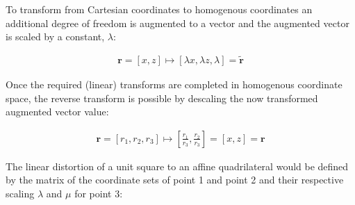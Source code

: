 %
To transform from Cartesian coordinates to homogenous coordinates an additional degree of freedom is augmented to a vector and the augmented vector is scaled by a constant, $\lambda$:

\begin{align}
\textbf{r} = [x,z] \mapsto  [\lambda x, \lambda z, \lambda] = \widetilde{\textbf{r}} \label{eq:cart2homo}
\end{align}

Once the required (linear) transforms are completed in homogenous coordinate space, the reverse transform is possible by descaling the now transformed augmented vector value:

\begin{align}
{\textbf{r}} =[r_1,r_2,r_3] \mapsto \left[\frac{r_1}{r_3},\frac{r_2}{r_3}\right] = [x,z] = \textbf{r} \label{eq:homo2cart} %
\end{align}


The linear distortion of a unit square to an affine quadrilateral would be defined by the matrix of the coordinate sets of point 1 and point 2 and their respective scaling $\lambda$ and $\mu$ for point 3:


